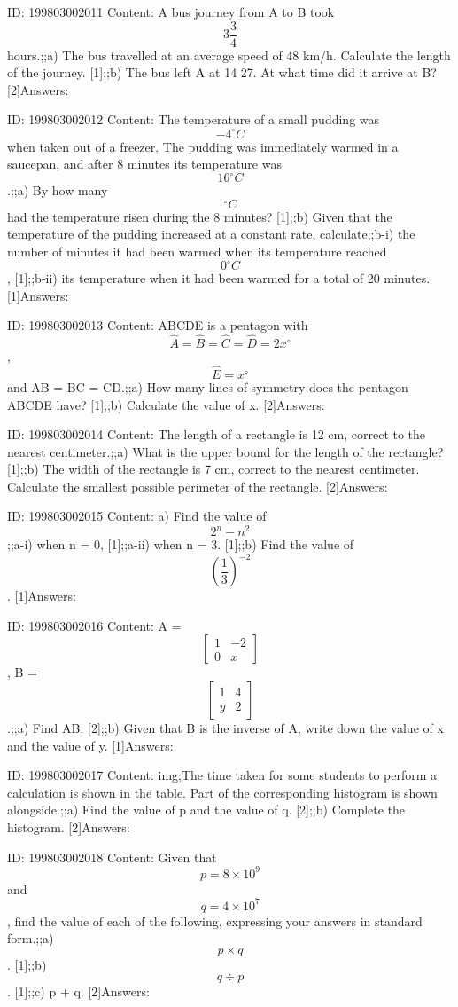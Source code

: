 \documentclass{article}
\begin{document}
ID: 199803002011
Content:
A bus journey from A to B took $$3 \frac{3}{4}$$ hours.;;a) The bus travelled at an average speed of 48 km/h. Calculate the length of the journey. [1];;b) The bus left A at 14 27. At what time did it arrive at B? [2]Answers:

ID: 199803002012
Content:
The temperature of a small pudding was $$-4^{\circ}C$$ when taken out of a freezer. The pudding was immediately warmed in a saucepan, and after 8 minutes its temperature was $$16^{\circ}C$$.;;a) By how many $$^{\circ}C$$ had the temperature risen during the 8 minutes? [1];;b) Given that the temperature of the pudding increased at a constant rate, calculate;;b-i) the number of minutes it had been warmed when its temperature reached $$0^{\circ}C$$, [1];;b-ii) its temperature when it had been warmed for a total of 20 minutes. [1]Answers:

ID: 199803002013
Content:
ABCDE is a pentagon with $$\hat A = \hat B = \hat C = \hat D = 2x^{\circ}$$, $$\hat E = x^{\circ}$$ and AB = BC = CD.;;a) How many lines of symmetry does the pentagon ABCDE have? [1];;b) Calculate the value of x. [2]Answers:

ID: 199803002014
Content:
The length of a rectangle is 12 cm, correct to the nearest centimeter.;;a) What is the upper bound for the length of the rectangle? [1];;b) The width of the rectangle is 7 cm, correct to the nearest centimeter. Calculate the smallest possible perimeter of the rectangle. [2]Answers:

ID: 199803002015
Content:
a) Find the value of $$2^n - n^2$$;;a-i) when n = 0, [1];;a-ii) when n = 3. [1];;b) Find the value of $$(\frac{1}{3})^{-2}$$. [1]Answers:

ID: 199803002016
Content:
A = $$\begin{bmatrix}1&-2\\0&x\end{bmatrix}$$, B = $$\begin{bmatrix}1&4\\y&2\end{bmatrix}$$.;;a) Find AB. [2];;b) Given that B is the inverse of A, write down the value of x and the value of y. [1]Answers:

ID: 199803002017
Content:
img;The time taken for some students to perform a calculation is shown in the table. Part of the corresponding histogram is shown alongside.;;a) Find the value of p and the value of q. [2];;b) Complete the histogram. [2]Answers:

ID: 199803002018
Content:
Given that $$p = 8 \times 10^9$$and $$q = 4 \times 10^7$$, find the value of each of the following, expressing your answers in standard form.;;a) $$p \times q$$. [1];;b) $$q \div p$$. [1];;c) p + q. [2]Answers:
\end{document}
